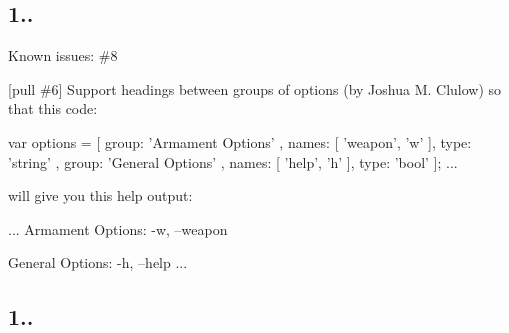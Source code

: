 \subsection*{1..}


\begin{DoxyItemize}
\item Known issues\+: \#8
\item \mbox{[}pull \#6\mbox{]} Support headings between groups of options (by Joshua M. Clulow) so that this code\+: \begin{DoxyVerb}  var options = [
      { group: 'Armament Options' },
      { names: [ 'weapon', 'w' ], type: 'string' },
      { group: 'General Options' },
      { names: [ 'help', 'h' ], type: 'bool' }
  ];
  ...
\end{DoxyVerb}


will give you this help output\+: \begin{DoxyVerb}  ...
    Armament Options:
      -w, --weapon

    General Options:
      -h, --help
  ...
\end{DoxyVerb}

\end{DoxyItemize}

\subsection*{1..}


